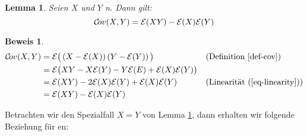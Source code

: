 \documentclass[a4paper]{article}
\newtheorem{lemma}[satz]{Lemma}
\theoremstyle{nonumberplain}
\newtheorem{beweis}{Beweis}
\begin{document}
\begin{lemma}\label{lemma-cov-exp}
	Seien $X$ und $Y$ \rvar{}n. Dann gilt:
\begin{equation}
	\mathcal{C}\!ov{}(X,Y) = \mathcal{E}(XY) - \mathcal{E}(X)\mathcal{E}(Y)
\end{equation}
\end{lemma}
\begin{beweis}
\begin{align*}
\mathcal{C}\!ov{}(X,Y) & = \mathcal{E}\big( \left(X - \mathcal{E}(X)\right)\left(Y - \mathcal{E}(Y)\right)\big) && \text{(Definition \ref{def-cov})} \\
& = \mathcal{E}\big(XY - X \mathcal{E}(Y) - Y \mathcal{E}(E) + \mathcal{E}(X)\mathcal{E}(Y)\big) \\
& = \mathcal{E}(XY) - 2 \mathcal{E}(X) \mathcal{E}(Y) + \mathcal{E}(X) \mathcal{E}(Y) && \text{(Linearität (\ref{eq-linearity}))}\\
& = \mathcal{E}(XY) - \mathcal{E}(X)\mathcal{E}(Y) \\
\end{align*}
\end{beweis}

Betrachten wir den Spezialfall $X = Y$  von Lemma \ref{lemma-cov-exp}, dann erhalten wir folgende Beziehung für \var{}en:
\end{document}
